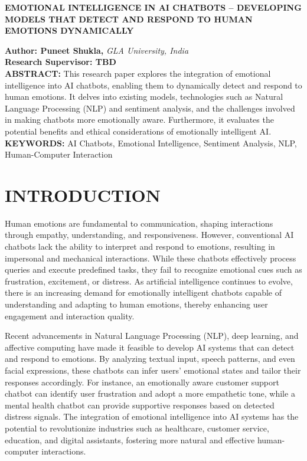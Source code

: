 \documentclass[a4paper,10pt]{article}
\begin{document}
\begin{center}
\textbf{{\Large EMOTIONAL INTELLIGENCE IN AI CHATBOTS – DEVELOPING MODELS THAT DETECT AND RESPOND TO HUMAN EMOTIONS DYNAMICALLY}} \\
\end{center}

\noindent 
\textbf{Author: Puneet Shukla,} \textit{GLA University, India}\\

\noindent 
\textbf{Research Supervisor: TBD}\\

\noindent 
\textbf{ABSTRACT: } This research paper explores the integration of emotional intelligence into AI chatbots, enabling them to dynamically detect and respond to human emotions. It delves into existing models, technologies such as Natural Language Processing (NLP) and sentiment analysis, and the challenges involved in making chatbots more emotionally aware. Furthermore, it evaluates the potential benefits and ethical considerations of emotionally intelligent AI.\\

\noindent 
\textbf{KEYWORDS:} AI Chatbots, Emotional Intelligence, Sentiment Analysis, NLP, Human-Computer Interaction\\

\section{INTRODUCTION}

\noindent Human emotions are fundamental to communication, shaping interactions through empathy, understanding, and responsiveness. However, conventional AI chatbots lack the ability to interpret and respond to emotions, resulting in impersonal and mechanical interactions. While these chatbots effectively process queries and execute predefined tasks, they fail to recognize emotional cues such as frustration, excitement, or distress. As artificial intelligence continues to evolve, there is an increasing demand for emotionally intelligent chatbots capable of understanding and adapting to human emotions, thereby enhancing user engagement and interaction quality.
\vspace{\baselineskip}

\noindent Recent advancements in Natural Language Processing (NLP), deep learning, and affective computing have made it feasible to develop AI systems that can detect and respond to emotions. By analyzing textual input, speech patterns, and even facial expressions, these chatbots can infer users' emotional states and tailor their responses accordingly. For instance, an emotionally aware customer support chatbot can identify user frustration and adopt a more empathetic tone, while a mental health chatbot can provide supportive responses based on detected distress signals. The integration of emotional intelligence into AI systems has the potential to revolutionize industries such as healthcare, customer service, education, and digital assistants, fostering more natural and effective human-computer interactions.
\end{document}
